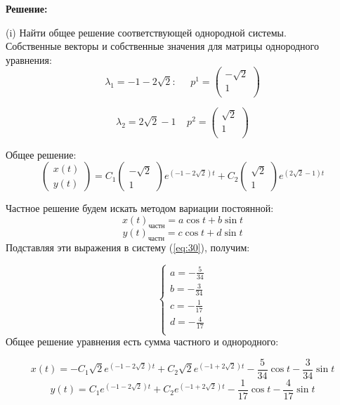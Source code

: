 \documentclass[a4paper, 12pt]{article}
\begin{document}
\textbf{Решение:} \par


(i) Найти общее решение соответствующей однородной системы.\\

Собственные векторы и собственные значения для матрицы однородного уравнения:
\[\lambda_1 = -1-2\sqrt 2 :\;\;\;\;\; p^1=
\left(
\begin{array}{cc}
-\sqrt 2\\
1\\
\end{array}
\right)  
\]



\[\lambda_2=2\sqrt 2-1\;\;\;\; p^2=
\left(
\begin{array}{cc}
\sqrt 2\\
1\\
\end{array}
\right) 
\]

Общее решение:
\[\left(
\begin{array}{c}
x(t)\\
y(t)
\end{array}
\right)=C_1\left(
\begin{array}{c}
-\sqrt 2 \\
1
\end{array}
\right)e^{(-1-2\sqrt 2)t}+C_2\left(
\begin{array}{c}
\sqrt 2 \\
1
\end{array}
\right)e^{(2\sqrt 2-1)t}\]

Частное решение будем искать методом вариации постоянной:
\[x(t)_{\text{частн}}=a\cos{t}+b\sin{t}\]
\[y(t)_{\text{частн}}=c\cos{t}+d\sin{t}\]
Подставляя эти выражения в систему (\ref{eq:30}), получим:

\[
\left\{
\begin{array}{lr}
a = -\frac {5} {34}\\
b = -\frac {3} {34}\\
c = -\frac {1} {17}\\
d = -\frac {4} {17}\\
\end{array}
\right.
\]
Общее решение уравнения есть сумма частного и однородного:

\begin{equation}
x(t) = -C_1\sqrt 2 e^{(-1-2\sqrt 2)t}+C_2\sqrt 2 e^{(-1+2\sqrt 2)t} -\frac {5} {34}\cos{t}-\frac {3} {34}\sin{t}
\label{eq:31}
\end{equation}
\begin{equation}
y(t) =C_1 e^{(-1-2\sqrt 2)t}+C_2 e^{(-1+2\sqrt 2)t} -\frac {1} {17}\cos{t}-\frac {4} {17}\sin{t}
\label{eq:32}
\end{equation}
\end{document}
